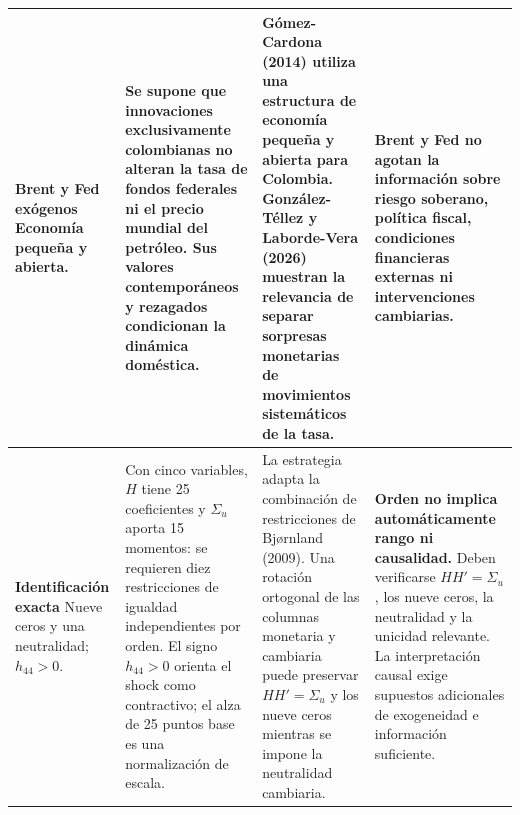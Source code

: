 \documentclass[12pt,letterpaper]{article}
\begin{document}
\begin{longtable}{@{}>{\raggedright\arraybackslash}p{}>{\raggedright\arraybackslash}p{}>{\raggedright\arraybackslash}p{}>{\raggedright\arraybackslash}p{}@{}}
\textbf{Brent y Fed exógenos}\newline
Economía pequeña y abierta.
& Se supone que innovaciones exclusivamente colombianas no alteran la tasa de fondos federales ni el precio mundial del petróleo. Sus valores contemporáneos y rezagados condicionan la dinámica doméstica.
& Gómez-Cardona (2014) utiliza una estructura de economía pequeña y abierta para Colombia. González-Téllez y Laborde-Vera (2026) muestran la relevancia de separar sorpresas monetarias de movimientos sistemáticos de la tasa.
& Brent y Fed no agotan la información sobre riesgo soberano, política fiscal, condiciones financieras externas ni intervenciones cambiarias.\\
\midrule

\textbf{Identificación exacta}\newline
Nueve ceros y una neutralidad; $h_{44}>0$.
& Con cinco variables, $H$ tiene 25 coeficientes y $\Sigma_u$ aporta 15 momentos: se requieren diez restricciones de igualdad independientes por orden. El signo $h_{44}>0$ orienta el shock como contractivo; el alza de 25 puntos base es una normalización de escala.
& La estrategia adapta la combinación de restricciones de Bj{\o}rnland (2009). Una rotación ortogonal de las columnas monetaria y cambiaria puede preservar $HH'=\Sigma_u$ y los nueve ceros mientras se impone la neutralidad cambiaria.
& \textbf{Orden no implica automáticamente rango ni causalidad.} Deben verificarse $HH'=\Sigma_u$, los nueve ceros, la neutralidad y la unicidad relevante. La interpretación causal exige supuestos adicionales de exogeneidad e información suficiente.\\
\end{longtable}
\endgroup
\end{document}
